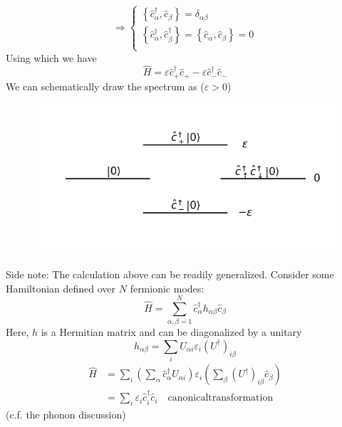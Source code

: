 \[ \Rightarrow \begin{cases}
	\left\{ \hat{c}_{\alpha}^{\dagger},\hat{c}_{\beta} \right\} =\delta _{\alpha \beta}\\
	\left\{ \hat{c}_{\alpha}^{\dagger},\hat{c}_{\beta}^{\dagger} \right\} =\left\{ \hat{c}_{\alpha},\hat{c}_{\beta} \right\} =0\\
\end{cases}\]
Using which we have
\[ \hat{H}=\varepsilon \hat{c}_{+}^{\dagger}\hat{c}_+-\varepsilon \hat{c}_{-}^{\dagger}\hat{c}_-\]
We can schematically draw the spectrum as ($\varepsilon>0$)
\begin{figure}[ht]
    \centering
    \includegraphics[width=\textwidth]{jupyterbook/data/fig/lec04-fig01.png}
\end{figure}

Side note: The calculation above can be readily generalized. Consider some Hamiltonian defined over $N$ fermionic modes:
\[ \hat{H}=\sum_{\alpha ,\beta =1}^N{\hat{c}_{\alpha}^{\dagger}h_{\alpha \beta}\hat{c}_{\beta}}\]
Here, $h$ is a Hermitian matrix and can be diagonalized by a unitary
\[ h_{\alpha \beta}=\sum_i{U_{\alpha i}\varepsilon _i\left( U^{\dagger} \right) _{i\beta}}\]
\begin{align*}
    \hat{H}&=\sum_i{\left( \sum_{\alpha}{\hat{c}_{\alpha}^{\dagger}}U_{\alpha i} \right) \varepsilon _i\left( \sum_{\beta}{\left( U^{\dagger} \right) _{i\beta}\hat{c}_{\beta}} \right)}\\
    &=\sum_i{\varepsilon _i\hat{c}_{i}^{\dagger}\hat{c}_i}\quad \mathrm{canonical transformation}
\end{align*}
(c.f. the phonon discussion)


